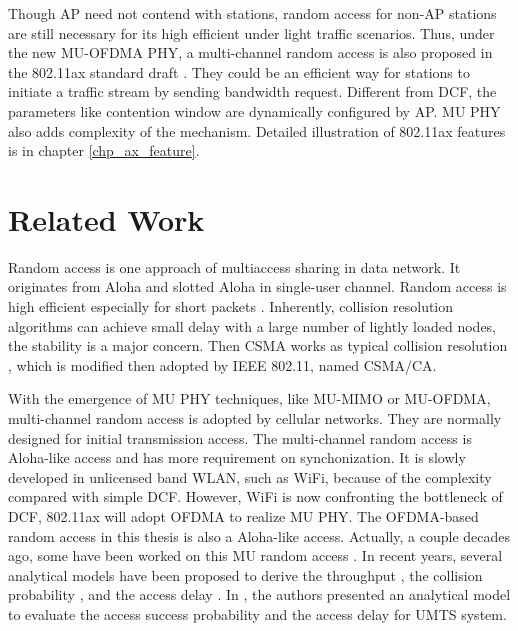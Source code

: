 Though AP need not contend with stations, random access for non-AP stations are still necessary for its high efficient under light traffic scenarios.
Thus, under the new MU-OFDMA PHY, a multi-channel random access is also proposed in the 802.11ax standard draft \cite{draft_ax}. 
They could be an efficient way for stations to initiate a traffic stream by sending bandwidth request.
Different from DCF, the parameters like contention window are dynamically configured by AP.
MU PHY also adds complexity of the mechanism.
Detailed illustration of 802.11ax features is in chapter \ref{chp_ax_feature}.


\section{Related Work}
Random access is one approach of multiaccess sharing in data network. 
It originates from Aloha and slotted Aloha in single-user channel\cite{abramson1970aloha}.
Random access is high efficient especially for short packets \cite{bertsekas1992data}.
Inherently, collision resolution algorithms can achieve small delay with a large number of lightly loaded nodes, the stability is a major concern\cite{bertsekas1992data}\cite{shen2003performance}. 
Then CSMA works as typical collision resolution  \cite{kleinrock1975packet}, which is modified then adopted by IEEE 802.11, named CSMA/CA. 


With the emergence of MU PHY techniques, like MU-MIMO or MU-OFDMA, multi-channel random access is adopted by cellular networks.
They are normally designed for initial transmission access.
The multi-channel random access is Aloha-like access and has more requirement on synchonization. 
It is slowly developed in unlicensed band WLAN, such as WiFi, because of the complexity compared with simple DCF.
However, WiFi is now confronting the bottleneck of DCF, 802.11ax will adopt OFDMA to realize MU PHY.
The OFDMA-based random access in this thesis is also a Aloha-like access. 
Actually, a couple decades ago, some have been worked on this MU random access\cite{rubin1978group} \cite{tan1987performance}\cite{marsan1987multichannel}\cite{zhang1992multichannel}\cite{pountourakis1992analysis}\cite{birk1999judicious}.
In recent years, several analytical models have been proposed to derive the throughput \cite{zhou2008efficient} \cite{shen2003performance} \cite{choi2006multichannel}, the collision probability \cite{kim2012performance} \cite{seo2011design}, and the access delay \cite{zhou2008efficient}\cite{kim2012performance} \cite{seo2011design}\cite{behroozi1992delay}. 
In \cite{kim2012performance}, the authors presented an analytical model to evaluate the access success probability and the access delay for UMTS system.

